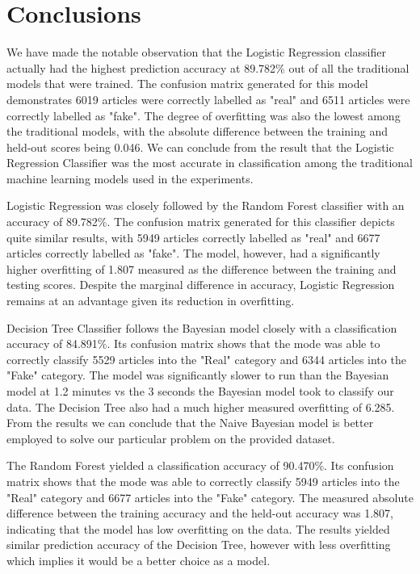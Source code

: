 \documentclass[10pt,twocolumn,letterpaper]{article}
\begin{document}
\section{Conclusions}
\small
We have made the notable observation that the Logistic Regression classifier actually had the highest prediction accuracy at 89.782\% out of all the traditional models that were trained. The confusion matrix generated for this model demonstrates 6019 articles were correctly labelled as "real" and 6511 articles were correctly labelled as "fake". The degree of overfitting was also the lowest among the traditional models, with the absolute difference between the training and held-out scores being 0.046. We can conclude from the result that the Logistic Regression Classifier was the most accurate in classification among the traditional machine learning models used in the experiments. \par

Logistic Regression was closely followed by the Random Forest classifier with an accuracy of 89.782\%. The confusion matrix generated for this classifier depicts quite similar results, with 5949 articles correctly labelled as "real" and 6677 articles correctly labelled as "fake". The model, however, had a significantly higher overfitting of 1.807 measured as the difference between the training and testing scores. Despite the marginal difference in accuracy, Logistic Regression remains at an advantage given its reduction in overfitting. \par

Decision Tree Classifier follows the Bayesian model closely with a classification accuracy of 84.891\%. Its confusion matrix shows that the mode was able to correctly classify 5529 articles into the "Real" category and 6344 articles into the "Fake" category. The model was significantly slower to run than the Bayesian model at 1.2 minutes vs the 3 seconds the Bayesian model took to classify our data. The Decision Tree also had a much higher measured overfitting of 6.285. From the results we can conclude that the Naive Bayesian model is better employed to solve our particular problem on the provided dataset.  \par

The Random Forest yielded a classification accuracy of 90.470\%. Its confusion matrix shows that the mode was able to correctly classify 5949 articles into the "Real" category and 6677 articles into the "Fake" category. The measured absolute difference between the training accuracy and the held-out accuracy was 1.807, indicating that the model has low overfitting on the data. The results yielded similar prediction accuracy of the Decision Tree, however with less overfitting which implies it would be a better choice as a model. \par
\end{document}
